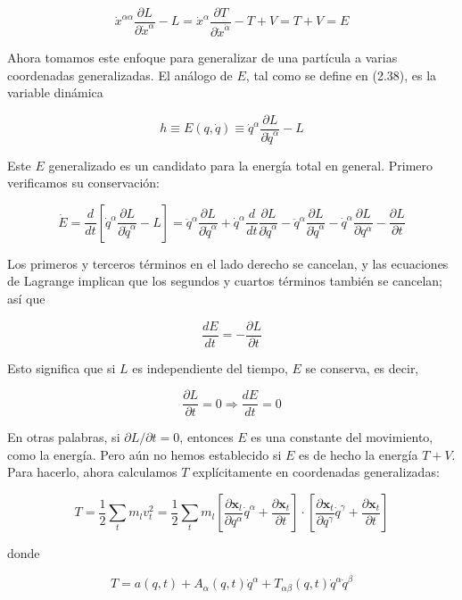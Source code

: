 $$
\dot{x}^{\alpha \alpha} \frac{\partial L}{\partial \dot{x}^{\alpha}} - L = \dot{x}^{\alpha} \frac{\partial T}{\partial \dot{x}^{\dot{\alpha}}} - T + V = T + V = E \tag{2.38}
$$

Ahora tomamos este enfoque para generalizar de una partícula a varias coordenadas generalizadas. El análogo de $E$, tal como se define en (2.38), es la variable dinámica

$$
h \equiv E(q, \dot{q}) \equiv \dot{q}^{\alpha} \frac{\partial L}{\partial \dot{q}^{\alpha}} - L \tag{2.39}
$$

Este $E$ generalizado es un candidato para la energía total en general. Primero verificamos su conservación:

$$
\dot{E} = \frac{d}{d t}\left[\dot{q}^{\alpha} \frac{\partial L}{\partial \dot{q}^{\alpha}} - L\right] = \ddot{q}^{\alpha} \frac{\partial L}{\partial \dot{q}^{\alpha}} + \dot{q}^{\alpha} \frac{d}{d t} \frac{\partial L}{\partial \dot{q}^{\alpha}} - \ddot{q}^{\alpha} \frac{\partial L}{\partial \dot{q}^{\alpha}} - \dot{q}^{\alpha} \frac{\partial L}{\partial q^{\alpha}} - \frac{\partial L}{\partial t}
$$

Los primeros y terceros términos en el lado derecho se cancelan, y las ecuaciones de Lagrange implican que los segundos y cuartos términos también se cancelan; así que

$$
\frac{d E}{d t} = -\frac{\partial L}{\partial t} \tag{2.40}
$$

Esto significa que si $L$ es independiente del tiempo, $E$ se conserva, es decir,

$$
\frac{\partial L}{\partial t} = 0 \Rightarrow \frac{d E}{d t} = 0 \tag{2.41}
$$

En otras palabras, si $\partial L / \partial t = 0$, entonces $E$ es una constante del movimiento, como la energía. Pero aún no hemos establecido si $E$ es de hecho la energía $T + V$. Para hacerlo, ahora calculamos $T$ explícitamente en coordenadas generalizadas:

$$
T = \frac{1}{2} \sum_{t} m_{l} v_{t}^{2} = \frac{1}{2} \sum_{t} m_{l} \left[\frac{\partial \mathbf{x}_{l}}{\partial q^{\alpha}} \dot{q}^{\alpha} + \frac{\partial \mathbf{x}_{t}}{\partial t}\right] \cdot \left[\frac{\partial \mathbf{x}_{t}}{\partial q^{\gamma}} \dot{q}^{\gamma} + \frac{\partial \mathbf{x}_{t}}{\partial t}\right]
$$

donde

$$
T = a(q, t) + A_{\alpha}(q, t) \dot{q}^{\alpha} + T_{\alpha \beta}(q, t) \dot{q}^{\alpha} \dot{q}^{\beta}
$$

